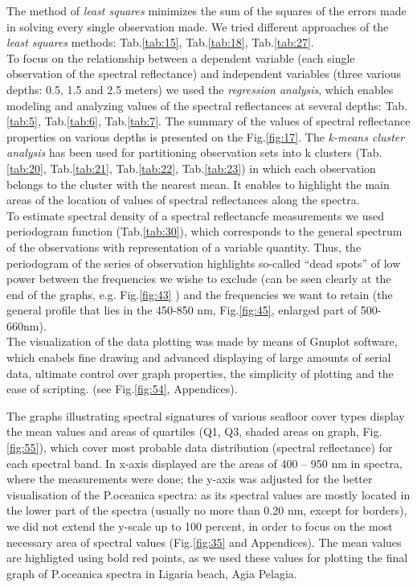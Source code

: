 \documentclass[10pt, a4paper]{article}
\begin{document}
The method of \textit{least squares} minimizes the sum of the squares of the errors made in solving every single observation made. We tried different approaches of the \textit{least squares} methods: Tab.\ref{tab:15}, Tab.\ref{tab:18}, Tab.\ref{tab:27}.\\
To focus on the relationship between a dependent variable (each single observation of the spectral reflectance) and independent variables (three various depths: 0.5, 1.5 and 2.5 meters) we used the \textit{regression analysis}, which enables modeling and analyzing values of the spectral reflectances at several depths: Tab.\ref{tab:5}, Tab.\ref{tab:6}, Tab.\ref{tab:7}. 
The summary of the values of spectral reflectance properties on various depths is presented on the Fig.\ref{fig:17}.
The \textit{k-means cluster analysis} has been used for partitioning observation sets into k clusters (Tab.\ref{tab:20}, Tab.\ref{tab:21}, Tab.\ref{tab:22}, Tab.\ref{tab:23}) in which each observation belongs to the cluster with the nearest mean.
It enables to highlight the main areas of the location of values of spectral reflectances along the spectra.\\
To estimate spectral density of a spectral reflectancfe measurements we used periodogram function (Tab.\ref{tab:30}), 
which corresponds to the general spectrum of the observations with representation of a variable quantity.  
Thus, the periodogram of the series of observation highlights so-called “dead spots” of low power between the frequencies we wishe to
exclude (can be seen clearly at the end of the graphs, e.g. Fig.\ref{fig:43} ) 
and the frequencies we want to retain (the general profile that lies in the 450-850 nm, Fig.\ref{fig:45}, enlarged part of 500-660nm).\\
The visualization of the data plotting was made by means of Gnuplot software, which enabels fine
drawing and advanced displaying of large amounts of serial data, ultimate control over graph properties, 
the simplicity of plotting and the ease of scripting. (see Fig.\ref{fig:54}, Appendices).

The graphs illustrating spectral signatures of various seafloor cover types display the mean values and
areas of quartiles (Q1, Q3, shaded areas on graph, Fig.\ref{fig:55}), which cover most probable data distribution
(spectral reflectance) for each spectral band. In x-axis displayed are the areas of 400 – 950 nm in
spectra, where the measurements were done; the y-axis was adjusted for the better visualisation of the
P.oceanica spectra: as its spectral values are mostly located in the lower part of the spectra (usually no
more than 0.20 nm, except for borders), we did not extend the y-scale up to 100 percent, in order to
focus on the most necessary area of spectral values (Fig.\ref{fig:35} and Appendices). The mean values are
highligted using bold red points, as we used these values for plotting the final graph of P.oceanica spectra in
Ligaria beach, Agia Pelagia.
\end{document}
